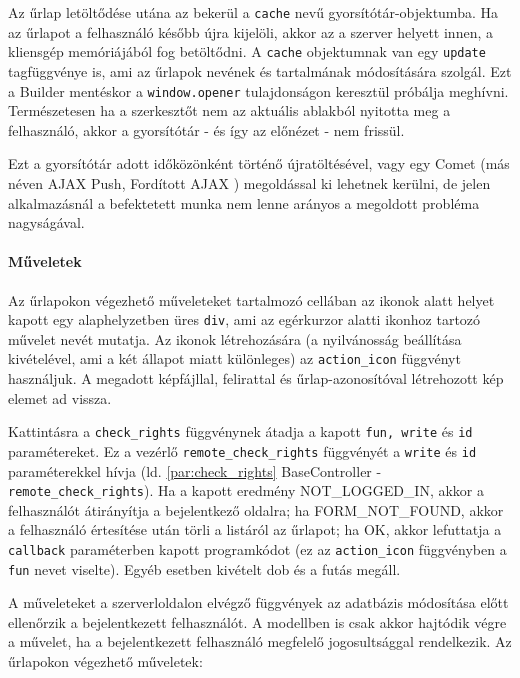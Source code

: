 \documentclass[12pt,a4paper,twoside]{article}
\begin{document}
Az űrlap letöltődése utána az bekerül a \texttt{cache} nevű
gyorsítótár-objektumba. Ha az űrlapot a felhasználó később újra kijelöli, akkor
az a szerver helyett innen, a kliensgép memóriájából fog betöltődni. A
\texttt{cache} objektumnak van egy \texttt{update} tagfüggvénye is, ami az
űrlapok nevének és tartalmának módosítására szolgál. Ezt a Builder mentéskor a
\texttt{window.opener} tulajdonságon keresztül próbálja meghívni. Természetesen
ha a szerkesztőt nem az aktuális ablakból nyitotta meg a felhasználó, akkor a
gyorsítótár - és így az előnézet - nem frissül.

Ezt a gyorsítótár adott időközönként történő újratöltésével, vagy egy Comet (más
néven AJAX Push, Fordított AJAX \cite{comet}) megoldással ki lehetnek kerülni,
de jelen alkalmazásnál a befektetett munka nem lenne arányos a megoldott
probléma nagyságával.


\paragraph{Műveletek}
Az űrlapokon végezhető műveleteket tartalmozó cellában az ikonok alatt helyet
kapott egy alaphelyzetben üres \texttt{div}, ami az egérkurzor alatti ikonhoz
tartozó művelet nevét mutatja. Az ikonok létrehozására (a nyilvánosság
beállítása kivételével, ami a két állapot miatt különleges) az
\texttt{action\_icon} függvényt használjuk. A megadott képfájllal, felirattal és
űrlap-azonosítóval létrehozott kép elemet ad vissza.

Kattintásra a \texttt{check\_rights} függvénynek átadja a kapott \texttt{fun,
  write} és \texttt{id} paramétereket. Ez a vezérlő
\texttt{remote\_check\_rights} függvényét a \texttt{write} és \texttt{id}
paraméterekkel hívja (ld. \ref{par:check_rights} BaseController -
\texttt{remote\_check\_rights}). Ha a kapott eredmény NOT\_LOGGED\_IN, akkor a
felhasználót átirányítja a bejelentkező oldalra; ha FORM\_NOT\_FOUND, akkor a
felhasználó értesítése után törli a listáról az űrlapot; ha OK, akkor lefuttatja
a \texttt{callback} paraméterben kapott programkódot (ez az
\texttt{action\_icon} függvényben a \texttt{fun} nevet viselte). Egyéb esetben
kivételt dob és a futás megáll.

A műveleteket a szerverloldalon elvégző függvények az adatbázis módosítása előtt
ellenőrzik a bejelentkezett felhasználót. A modellben is csak akkor hajtódik
végre a művelet, ha a bejelentkezett felhasználó megfelelő jogosultsággal
rendelkezik. Az űrlapokon végezhető műveletek:
\end{document}
